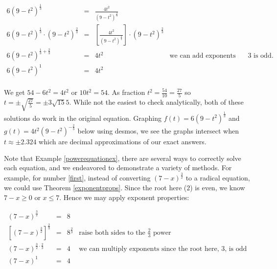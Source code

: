 \documentclass{ximera}
\begin{document}
\begin{example}
\begin{enumerate}
\[ \begin{array}{rclr}

6(9-t^2)^{\frac{1}{3}} & = & \frac{4t^2}{(9-t^2)^{\frac{2}{3}}} & \\

6(9-t^2)^{\frac{1}{3}} \cdot (9-t^2)^{\frac{2}{3}} & = & \left[   \frac{4t^2}{(9-t^2)^{\frac{2}{3}}}  \right ] \cdot (9-t^2)^{\frac{2}{3}} & \\

6(9-t^2)^{\frac{1}{3} + \frac{2}{3}}& = & 4t^2 &  \text{we can add exponents since the root here $3$ is odd.} \\

6(9-t^2)^{1} & = & 4t^2 &\\   \end{array} \]

We get $54 - 6t^2 = 4t^2$ or $10t^2 = 54$.  As fraction $t^2 = \frac{54}{10} = \frac{27}{5}$ so $t = \pm \sqrt{\frac{27}{5}} = \pm 3 \sqrt{15}{5}$.  While not the easiest to check analytically, both of these solutions do work in the original equation.  Graphing $f(t) = 6(9-t^2)^{\frac{1}{3}} $ and $g(t) =  4t^2 (9-t^2)^{-\frac{2}{3}}$ below using desmos, we see the graphs intersect when $t \approx \pm 2.324$ which are decimal approximations of our exact answers.

\begin{center}
\end{center} 

\end{enumerate}

\end{example}

Note that Example \ref{powerequationex}, there are several ways to correctly solve each equation, and we endeavored to demonstrate a variety of methods.  For example, for number \ref{first}, instead of converting $(7-x)^{\frac{3}{2}}$ to a radical equation, we could use Theorem \ref{exponentprops}.  Since the root here ($2$) is even, we know $7-x \geq 0$ or $x \leq 7$.  Hence we may apply exponent properties: 

\[ \begin{array}{rclr}  

(7-x)^{\frac{3}{2}} & = & 8 & \\

 \left[(7-x)^{\frac{3}{2}}\right]^{\frac{2}{3}} & = & 8^{\frac{2}{3}} & \text{raise both sides to the $\frac{2}{3}$ power} \\
 
 (7-x)^{\frac{3}{2} \cdot \frac{2}{3}} & = & 4 & \text{we can multiply exponents since the root here, 3, is odd} \\
 
(7-x)^{1} & = & 4 \\ \end{array} \]
\end{document}
